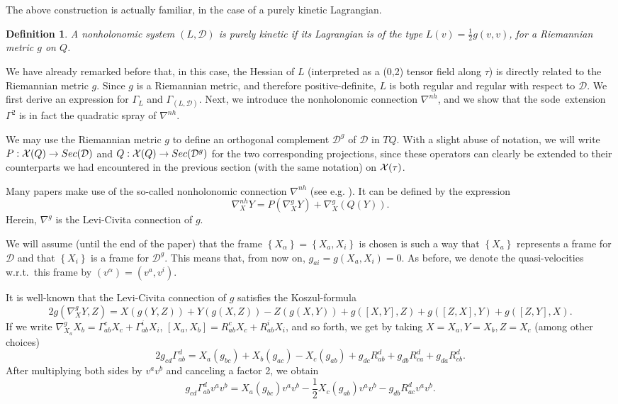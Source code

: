 \documentclass[11pt]{article}
\newtheorem{defi}{Definition}
\def\vectorfields#1{{\cal X}(#1)}
\def\sode{{\sc sode}}
\def\D{{\mathcal D}}
\def\GLD{{\Gamma_{(L,\mathcal{D})}}}
\begin{document}
The above construction is actually familiar, in the case of a  purely kinetic Lagrangian.

\begin{defi}
A nonholonomic system $(L,\D)$ is purely kinetic if its Lagrangian is of the type $L(v)=\frac{1}{2}g(v,v)$, for a Riemannian metric $g$ on $Q$.
\end{defi}
We have already remarked before that, in this case, the Hessian of $L$ (interpreted as a (0,2) tensor field along $\tau$) is directly related to the Riemannian metric $g$. Since $g$ is a Riemannian metric, and therefore positive-definite, $L$ is both regular and regular with respect to $\D$.  We first derive an expression for $\Gamma_L$ and $\GLD$. Next, we introduce the nonholonomic connection $\nabla^{nh}$, and we show that the \sode\ extension $\Gamma^2$ is in fact the quadratic spray of  $\nabla^{nh}$. 

We may use the Riemannian metric $g$ to define an orthogonal complement $\D^g$ of $\D$ in $TQ$. With a slight abuse of notation, we will write $P:\vectorfields{Q}\to {\rm Sec}(\D)$ and $Q:\vectorfields{Q}\to {\rm Sec}(\D^g)$ for the two corresponding projections, since these operators can clearly be extended to their counterparts we had encountered in the previous section (with the same notation) on $\vectorfields{\tau}$.

Many papers make use of the so-called  nonholonomic connection $\nabla^{nh}$ (see e.g. \cite{Lewis,Cortes}). It can be  defined by the expression 
$$
\nabla_X^{nh} Y=P\left(\nabla_X^g Y\right)+\nabla_X^g(Q(Y)).   %
$$
Herein, $\nabla^g$ is the Levi-Civita connection of $g$.


We will assume (until the end of the paper)  that the frame $\left\{X_{\alpha}\right\} = \left\{X_{a},X_i\right\}$ is chosen is such a way that $\left\{X_{a}\right\}$ represents a frame for $\mathcal{D}$ and that $\left\{X_{i}\right\}$ is a frame for $\mathcal{D}^g$. This means that, from now on,  $g_{a i}=g\left(X_{a}, X_{i}\right)=0$.
As before, we denote the quasi-velocities w.r.t.\ this frame by $(v^\alpha)=(v^a,v^i)$.


It is well-known that the  Levi-Civita connection of $g$ satisfies the Koszul-formula
\[{2 g(\nabla_{X}^{g} Y, Z)=X(g (Y, Z))+Y(g(X, Z))-Z (g (X, Y))+g([X, Y], Z)  +g([Z, X], Y)+g([Z, Y], X) .}
\]
If we write $\nabla^g_{X_a}X_b = \Gamma_{ab}^cX_c + \Gamma_{ab}^i X_i$, $[X_a,X_b] =R_{ab}^c X_c+ R_{ab}^i X_i$, and so forth, we get by taking $X=X_a, Y=X_b, Z=X_c$ (among other choices) 
$$
2 g_{c d} \Gamma_{a b}^{d}=X_{a}(g_{b c})+X_{b}(g_{a c})-X_{c}(g_{a b})
+g_{d c} R_{a b}^{d} + g_{d b} R_{c a}^{d} + g_{d a} R_{c b}^{d}. 
$$
After multiplying both sides by $v^av^b$ and canceling a factor 2, we obtain
$$g_{c d} \Gamma_{a b}^{d} v^{a} v^{b}=X_{a}\left(g_{b c}\right) v^{a} v^{b}-\frac{1}{2} X_{c}\left(g_{a b}\right) v^{a} v^{b} 
-g_{d b} R_{a c}^{d} v^{a} v^{b}.$$
\end{document}
